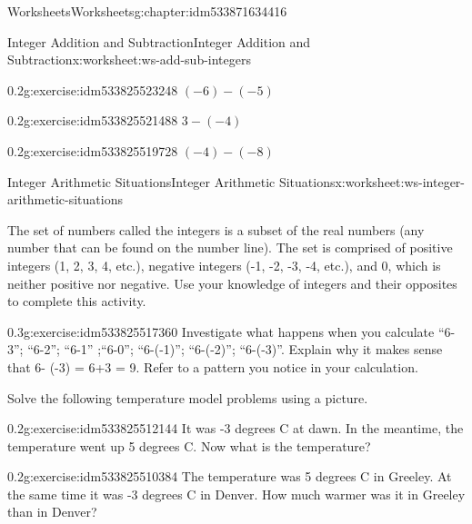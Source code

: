 \documentclass[twoside,11pt,]{book}
\begin{document}
\begin{chapterptx}{Worksheets}{}{Worksheets}{}{}{g:chapter:idm533871634416}
\begin{worksheet-section-numberless}{Integer Addition and Subtraction}{}{Integer Addition and Subtraction}{}{}{x:worksheet:ws-add-sub-integers}
\begin{divisionexercise}{6}{}{0.2}{g:exercise:idm533825523248}
\((-6)-(-5) \)%
\end{divisionexercise}%
\begin{divisionexercise}{7}{}{0.2}{g:exercise:idm533825521488}%
\(3-(-4) \)%
\end{divisionexercise}%
\begin{divisionexercise}{8}{}{0.2}{g:exercise:idm533825519728}%
\((-4)-(-8) \)%
\end{divisionexercise}%
\end{worksheet-section-numberless}
\restoregeometry
%
%
\typeout{************************************************}
\typeout{************************************************}
%
\begin{worksheet-section-numberless}{Integer Arithmetic Situations}{}{Integer Arithmetic Situations}{}{}{x:worksheet:ws-integer-arithmetic-situations}
\begin{introduction}{}%
The set of numbers called the integers is a subset of the real numbers (any number that can be found on the number line).  The set is comprised of positive integers (1, 2, 3, 4, etc.), negative integers (-1, -2, -3, -4, etc.), and 0, which is neither positive nor negative.  Use your knowledge of integers and their opposites to complete this activity.%
\end{introduction}%
\begin{divisionexercise}{1}{}{0.3}{g:exercise:idm533825517360}%
Investigate what happens when you calculate ``6-3'';  ``6-2'';  ``6-1'' ;``6-0''; ``6-(-1)'';     ``6-(-2)''; ``6-(-3)''.  Explain why it makes sense that 6- (-3) = 6+3 = 9.   Refer to a pattern you notice in your calculation.%
\end{divisionexercise}%
\begin{introduction}{}%
Solve the following temperature model problems using a picture.%
\end{introduction}%
\begin{divisionexercise}{2}{}{0.2}{g:exercise:idm533825512144}%
It was -3 degrees C at dawn. In the meantime, the temperature went up 5 degrees C. Now what is the temperature?%
\end{divisionexercise}%
\clearpage
\begin{divisionexercise}{3}{}{0.2}{g:exercise:idm533825510384}%
The temperature was 5 degrees C in Greeley. At the same time it was -3 degrees C in Denver. How much warmer was it in Greeley than in Denver?%
\end{divisionexercise}%

\end{worksheet-section-numberless}
\end{chapterptx}
\end{document}
